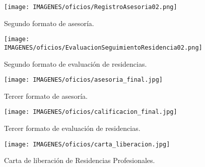 \begin{figure}[h]
	\centering
	\texttt{[image: IMAGENES/oficios/RegistroAsesoria02.png]}
	\caption{Segundo formato de asesoría.}
	\label{oficio_asesoria2}
\end{figure}

\begin{figure}[h]
	\centering
	\texttt{[image: IMAGENES/oficios/EvaluacionSeguimientoResidencia02.png]}
	\caption{Segundo formato de evaluación de residencias.}
	\label{oficio_evaluacion2}
\end{figure}

\begin{figure}[h]
	\centering
	\texttt{[image: IMAGENES/oficios/asesoria\_final.jpg]}
	\caption{Tercer formato de asesoría.}
\end{figure}

\begin{figure}[h]
	\centering
	\texttt{[image: IMAGENES/oficios/calificacion\_final.jpg]}
	\caption{Tercer formato de evaluación de residencias.}
\end{figure}

\begin{figure}[h]
	\centering
	\texttt{[image: IMAGENES/oficios/carta\_liberacion.jpg]}
	\caption{Carta de liberación de Residencias Profesionales.}
\end{figure}